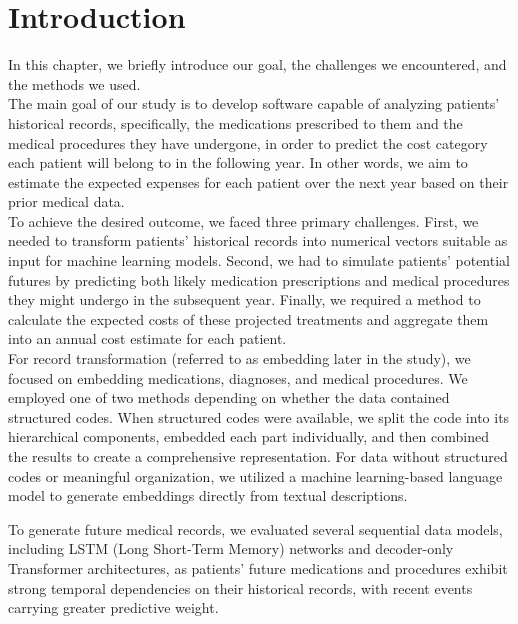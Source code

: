 
\chapter{Introduction}

In this chapter, we briefly introduce our goal, the challenges we encountered, and the methods we used.
\\

The main goal of our study is to develop software capable of analyzing patients’ historical records, specifically, the medications prescribed to them and the medical procedures they have undergone, in order to predict the cost category each patient will belong to in the following year. In other words, we aim to estimate the expected expenses for each patient over the next year based on their prior medical data. 
\\

To achieve the desired outcome, we faced three primary challenges. First, we needed to transform patients' historical records into numerical vectors suitable as input for machine learning models. Second, we had to simulate patients' potential futures by predicting both likely medication prescriptions and medical procedures they might undergo in the subsequent year. Finally, we required a method to calculate the expected costs of these projected treatments and aggregate them into an annual cost estimate for each patient.
\\

For record transformation (referred to as embedding later in the study), we focused on embedding medications, diagnoses, and medical procedures. We employed one of two methods depending on whether the data contained structured codes. When structured codes were available, we split the code into its hierarchical components, embedded each part individually, and then combined the results to create a comprehensive representation. For data without structured codes or meaningful organization, we utilized a machine learning-based language model to generate embeddings directly from textual descriptions.
\newpage

To generate future medical records, we evaluated several sequential data models, including LSTM (Long Short-Term Memory) networks and decoder-only Transformer architectures, as patients' future medications and procedures exhibit strong temporal dependencies on their historical records, with recent events carrying greater predictive weight.
\\

